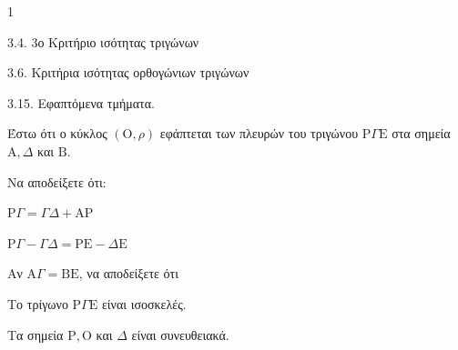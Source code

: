 \begin{ylh}{1}
    \item 3.4. 3ο Κριτήριο ισότητας τριγώνων
    \item 3.6. Κριτήρια ισότητας ορθογώνιων τριγώνων
    \item 3.15. Εφαπτόμενα τμήματα.
\end{ylh}
Έστω ότι ο κύκλος $(\mathrm{O}, \rho)$ εφάπτεται των πλευρών του τριγώνου $\mathrm{P}\Gamma\mathrm{E}$ στα σημεία $\mathrm{A}, \Delta$ και $\mathrm{B}$.
\begin{alist}
    \item Να αποδείξετε ότι:
    \begin{rlist}
        \item $\mathrm{P}\Gamma = \Gamma\Delta + \mathrm{A}\mathrm{P}$ 
        \item $\mathrm{P}\Gamma - \Gamma\Delta = \mathrm{P}\mathrm{E} - \Delta\mathrm{E}$ 
    \end{rlist}
    \item Αν $\mathrm{A}\Gamma = \mathrm{B}\mathrm{E}$, να αποδείξετε ότι
    \begin{rlist}
        \item Το τρίγωνο $\mathrm{P}\Gamma\mathrm{E}$ είναι ισοσκελές. 
        \item Τα σημεία $\mathrm{P}, \mathrm{O}$ και $\Delta$ είναι συνευθειακά. 
    \end{rlist}
\end{alist}
